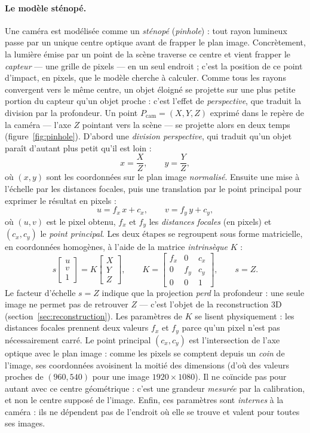 \paragraph{Le modèle sténopé.} Une caméra est modélisée comme un \emph{sténopé} (\emph{pinhole}) : tout rayon lumineux passe par un unique centre optique avant de frapper le plan image. Concrètement, la lumière émise par un point de la scène traverse ce centre et vient frapper le \emph{capteur} --- une grille de pixels --- en un seul endroit ; c'est la position de ce point d'impact, en pixels, que le modèle cherche à calculer. Comme tous les rayons convergent vers le même centre, un objet éloigné se projette sur une plus petite portion du capteur qu'un objet proche : c'est l'effet de \emph{perspective}, que traduit la division par la profondeur. Un point $P_{\text{cam}} = (X, Y, Z)$ exprimé dans le repère de la caméra --- l'axe $Z$ pointant vers la scène --- se projette alors en deux temps (figure~\ref{fig:pinhole}). D'abord une \emph{division perspective}, qui traduit qu'un objet paraît d'autant plus petit qu'il est loin :
\[
  x = \frac{X}{Z}, \qquad y = \frac{Y}{Z},
\]
où $(x, y)$ sont les coordonnées sur le plan image \emph{normalisé}. Ensuite une mise à l'échelle par les distances focales, puis une translation par le point principal pour exprimer le résultat en pixels :
\[
  u = f_x\,x + c_x, \qquad v = f_y\,y + c_y ,
\]
où $(u,v)$ est le pixel obtenu, $f_x$ et $f_y$ les \emph{distances focales} (en pixels) et $(c_x, c_y)$ le \emph{point principal}.
Les deux étapes se regroupent sous forme matricielle, en coordonnées homogènes, à l'aide de la matrice \emph{intrinsèque} $K$ :
\[
  s \begin{bmatrix} u \\ v \\ 1 \end{bmatrix}
  = K \begin{bmatrix} X \\ Y \\ Z \end{bmatrix},
  \qquad
  K = \begin{bmatrix} f_x & 0 & c_x \\ 0 & f_y & c_y \\ 0 & 0 & 1 \end{bmatrix},
  \qquad s = Z .
\]
Le facteur d'échelle $s = Z$ indique que la projection \emph{perd} la profondeur : une seule image ne permet pas de retrouver $Z$ --- c'est l'objet de la reconstruction 3D (section~\ref{sec:reconstruction}). Les paramètres de $K$ se lisent physiquement : les distances focales prennent deux valeurs $f_x$ et $f_y$ parce qu'un pixel n'est pas nécessairement carré. Le point principal $(c_x, c_y)$ est l'intersection de l'axe optique avec le plan image : comme les pixels se comptent depuis un \emph{coin} de l'image, ses coordonnées avoisinent la moitié des dimensions (d'où des valeurs proches de $(960, 540)$ pour une image $1920\times1080$). Il ne coïncide pas pour autant avec ce centre géométrique : c'est une grandeur \emph{mesurée} par la calibration, et non le centre supposé de l'image. Enfin, ces paramètres sont \emph{internes} à la caméra : ils ne dépendent pas de l'endroit où elle se trouve et valent pour toutes ses images.

